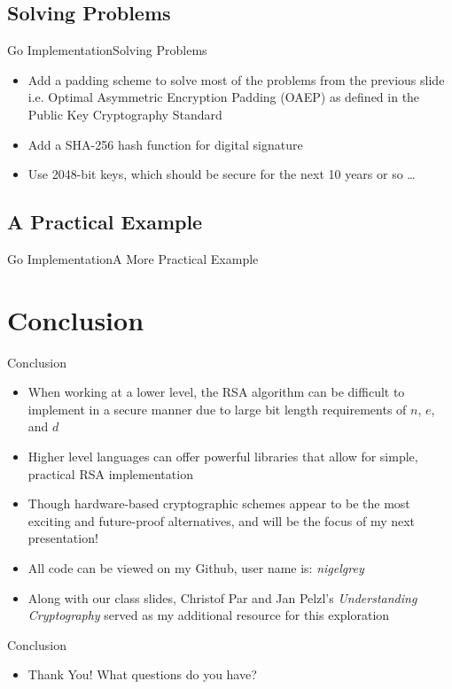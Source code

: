 \documentclass[presentation]{beamer}
\begin{document}
\subsection{Solving Problems}
\begin{frame}{Go Implementation}{Solving Problems}
  \begin{itemize}
    \item Add a padding scheme to solve most of the problems from the
      previous slide i.e. Optimal Asymmetric Encryption Padding (OAEP) as
      defined in the Public Key Cryptography Standard
      \pause
    \item Add a SHA-256 hash function for digital signature
      \pause
    \item Use 2048-bit keys, which should be secure for the next 10
      years or so \ldots
  \end{itemize}
\end{frame}
\subsection{A Practical Example}
\begin{frame}{Go Implementation}{A More Practical Example}
  \begin{center}
  \end{center}
\end{frame}
\section{Conclusion}
\begin{frame}{Conclusion}
  \begin{itemize}
    \item When working at a lower level, the RSA algorithm can be difficult to
      implement in a secure manner due to large bit length requirements of $n$,
      $e$, and $d$
      \pause
    \item Higher level languages can offer powerful libraries that allow for
      simple, practical RSA implementation
      \pause
    \item Though hardware-based cryptographic schemes appear to be the most
      exciting and future-proof alternatives, and will be the focus of my next
      presentation!
      \pause
    \item All code can be viewed on my Github, user name is: \textit{nigelgrey}
      \pause
    \item Along with our class slides, Christof Par and Jan Pelzl's
      \textit{Understanding Cryptography} served as my additional resource for
      this exploration
  \end{itemize}
\end{frame}
\begin{frame}{Conclusion}
  \begin{itemize}
      \item Thank You! What questions do you have?
      \end{itemize}
\end{frame}
\end{document}
